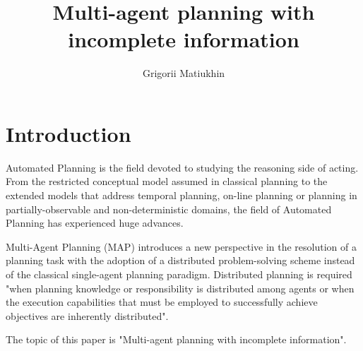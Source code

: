 \documentclass[12pt]{article}
\author{Grigorii Matiukhin}
\date{\DTMDisplaydate{2024}{3}{17}{-1}}
\title{Multi-agent planning with incomplete information}
\begin{document}
\maketitle
\thispagestyle{empty}

\newpage

\tableofcontents

\newpage
\section{Introduction}

Automated Planning is the field devoted to studying the reasoning side of acting.
From the restricted conceptual model assumed in classical planning to the extended models that address temporal planning, on-line planning or planning in partially-observable and non-deterministic domains, the field of Automated Planning has experienced huge advances\cite{ghallab2004automated}.

Multi-Agent Planning (MAP) introduces a new perspective in the resolution of a planning task with the adoption of a distributed problem-solving scheme instead of the classical single-agent planning paradigm.
Distributed planning is required "when planning knowledge or responsibility is distributed among agents or when the execution capabilities that must be employed to successfully achieve objectives are inherently distributed"\cite{desJardins1999ASO}.

The topic of this paper is "Multi-agent planning with incomplete information".

\end{document}
